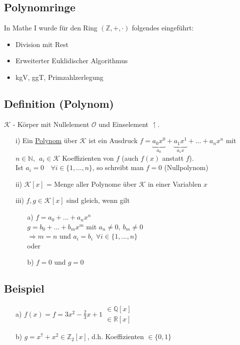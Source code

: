 \documentclass[a4paper, 12pt,titlepage, pdf, headsepline]{article}
\newcommand{\N}{\mathds{N}}
\newcommand{\uline}[1]{\underline{#1}}
\renewcommand{\>}{\rightarrow}
\renewcommand{\*}{\cdot}
\begin{document}
		      	\subsection*{Polynomringe}
		      	In Mathe I wurde für den Ring $(\mathds{Z},+,\*)$ folgendes eingeführt:
		      	\begin{itemize}
		      		\item Division mit Rest
		      		\item Erweiterter Euklidischer Algorithmus
		      		\item kgV, ggT, Primzahlzerlegung
		      	\end{itemize}
		      	\subsection{Definition (Polynom)}
		      	$\mathcal{K}$ - Körper mit Nullelement $\mathcal{O}$ und Einselement $\upharpoonleft$.
		      	\begin{itemize}
		      		\item[i)] Ein \uline{Polynom} über $\mathcal{K}$ ist ein Ausdruck $f = \underbrace{a_0x^0}_{a_0} + \underbrace{a_1x^1}_{a_1x} + ... + a_nx^n $ mit $ n \in \N, ~~a_i \in \mathcal{K}$ Koeffizienten von $f$ (auch $f(x)$ anstatt $f$).\\
		      		      Ist $a_i = 0 \quad\forall i \in \{1,...,n\}$, so schreibt man $f= 0$ (Nullpolynom)
		      		\item[ii)] $\mathcal{K}[x]$ = Menge aller Polynome über $\mathcal{K}$ in einer Variablen $x$
		      		\item[iii)] $f,g \in \mathcal{K}[x]$ sind gleich, wenn gilt
		      		      \begin{itemize}
		      		      	\item[a)]  $f = a_0 + ... + a_n x^n$ \\
		      		      	      $g = b_0 +...+ b_mx^m$ mit $a_n \neq 0, ~b_m \neq 0$ \\
                                              $\Rightarrow m = n$ und $a_i = b_i ~~\forall i \in \{1,...,n\}$\\
		      		      	      oder
		      		      	\item[b)] $f= 0$ und $g= 0$
		      		      \end{itemize}
		      	\end{itemize}
		      	\subsection{Beispiel}
		      	\begin{itemize}
		      		\item[a)] $f(x) = f = 3x^2 - \frac{2}{3}x +1  \substack{\in\mathds{Q}[x]\\ \in \mathds{R}[x]}$
		      		\item[b)] $g = x^7 + x^2 \in \mathds{Z}_2[x]$, d.h. Koeffizienten $\in \{0,1\}$
		      	\end{itemize}
\end{document}
